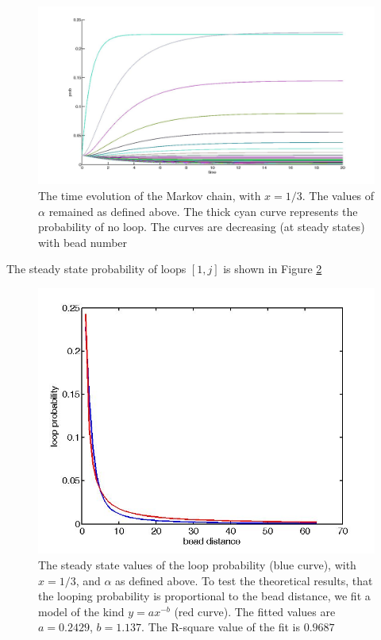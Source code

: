 \documentclass[12pt]{article}
\begin{document}
\begin{figure}[h]\label{chain64BeadsEqualProbSteadyState}
\includegraphics[scale=0.2]{chain64BeadsEqualProbSteadyState}
\caption{\scriptsize{The time evolution of the Markov chain, with $x=1/3$. The values of $\alpha$ remained as defined above. The thick cyan curve represents the probability of no loop. The curves are decreasing (at steady states) with bead number}}
\end{figure}

The steady state probability of loops $[1,j]$ is shown in Figure \ref{loopProbabilitySteadyState64Beads}
\begin{figure}[h]\label{loopProbabilitySteadyState64Beads}
\includegraphics[scale=0.3]{loopProbabilitySteadyState64Beads}
\caption{\scriptsize{The steady state values of the loop probability (blue curve), with $x=1/3$, and $\alpha$ as defined above. To test the theoretical results, that the looping probability is proportional to the bead distance, we fit a model of the kind $y=ax^{-b}$ (red curve). The fitted values are $a=0.2429$, $b=1.137$. The R-square value of the fit is $0.9687$}}
\end{figure}
 
\end{document}
